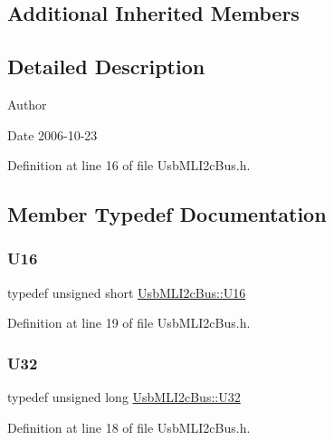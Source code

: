 \subsection*{Additional Inherited Members}


\subsection{Detailed Description}
\begin{DoxyAuthor}{Author}

\end{DoxyAuthor}
\begin{DoxyDate}{Date}
2006-\/10-\/23 
\end{DoxyDate}


Definition at line 16 of file Usb\+M\+L\+I2c\+Bus.\+h.



\subsection{Member Typedef Documentation}
\mbox{\label{classUsbMLI2cBus_a0b984fbce2470afccf2e1bc4ffd96da7}} 
\subsubsection{\texorpdfstring{U16}{U16}}
{\footnotesize\ttfamily typedef unsigned short \hyperlink{classUsbMLI2cBus_a0b984fbce2470afccf2e1bc4ffd96da7}{Usb\+M\+L\+I2c\+Bus\+::\+U16}}



Definition at line 19 of file Usb\+M\+L\+I2c\+Bus.\+h.

\mbox{\label{classUsbMLI2cBus_a27c83a30911e97fca2756efaf382c513}} 
\subsubsection{\texorpdfstring{U32}{U32}}
{\footnotesize\ttfamily typedef unsigned long \hyperlink{classUsbMLI2cBus_a27c83a30911e97fca2756efaf382c513}{Usb\+M\+L\+I2c\+Bus\+::\+U32}}



Definition at line 18 of file Usb\+M\+L\+I2c\+Bus.\+h.

